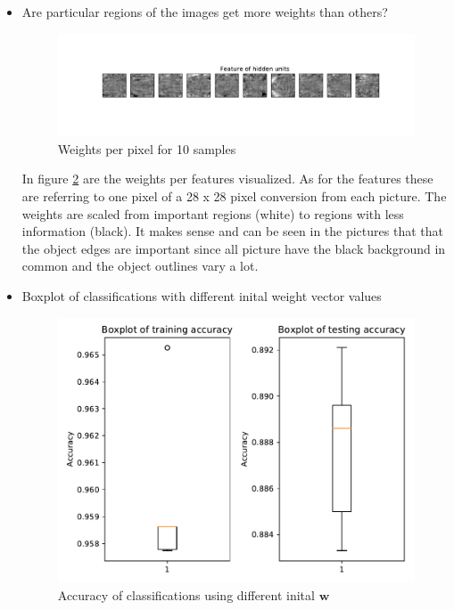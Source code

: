 \documentclass{article}
\begin{document}
\begin{itemize}
    \item Are particular regions of the images get more weights than others?
      
        \begin{figure}[!ht]
		\centering
		\includegraphics[width=1.2 \textwidth]{./Figures/2_weights.pdf}
		\caption{Weights per pixel for 10 samples}
		\label{weights}
		\end{figure}
	
	    In figure \ref{weights} are the weights per features visualized. As for the features these are referring to one pixel of a 28 x 28 pixel conversion from each picture. The weights are scaled from important regions (white) to regions with less information (black). It makes sense and can be seen in the pictures that that the object edges are important since all picture have the black background in common and the object outlines vary a lot.
	  
	\newpage    
    \item Boxplot of classifications with different inital weight vector values
    
        \begin{figure}[!ht]
		\centering
		\includegraphics[width=1 \textwidth]{./Figures/2_boxplot.pdf}
		\caption{Accuracy of classifications using different inital $\mathbf{w}$}
		\label{weights}
		\end{figure}
		

\end{itemize}
\end{document}
